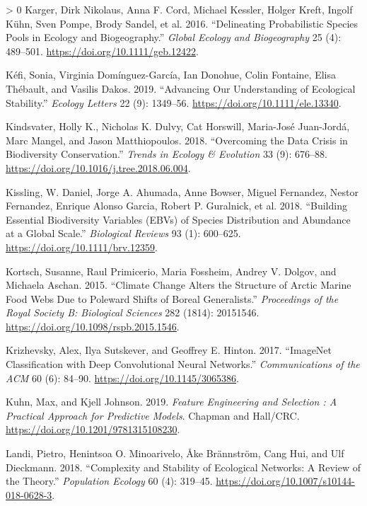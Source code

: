 \documentclass[11pt]{article}
\newlength{\cslhangindent}
\newenvironment{CSLReferences}[3] %
 {%
  \setlength{\parindent}{0pt}
  \ifodd #1 \everypar{\setlength{\hangindent}{\cslhangindent}}\ignorespaces\fi
  \ifnum #2 > 0
  \setlength{\parskip}{#2\baselineskip}
  \fi
 }%
 {}
\begin{document}
\begin{CSLReferences}{1}{0}
\leavevmode\hypertarget{ref-Karger2016DelPro}{}%
Karger, Dirk Nikolaus, Anna F. Cord, Michael Kessler, Holger Kreft,
Ingolf Kühn, Sven Pompe, Brody Sandel, et al. 2016. {``Delineating
Probabilistic Species Pools in Ecology and Biogeography.''} \emph{Global
Ecology and Biogeography} 25 (4): 489--501.
\url{https://doi.org/10.1111/geb.12422}.

\leavevmode\hypertarget{ref-Kefi2019AdvOur}{}%
Kéfi, Sonia, Virginia Domínguez-García, Ian Donohue, Colin Fontaine,
Elisa Thébault, and Vasilis Dakos. 2019. {``Advancing Our Understanding
of Ecological Stability.''} \emph{Ecology Letters} 22 (9): 1349--56.
\url{https://doi.org/10.1111/ele.13340}.

\leavevmode\hypertarget{ref-Kindsvater2018OveDat}{}%
Kindsvater, Holly K., Nicholas K. Dulvy, Cat Horswill, Maria-José
Juan-Jordá, Marc Mangel, and Jason Matthiopoulos. 2018. {``Overcoming
the Data Crisis in Biodiversity Conservation.''} \emph{Trends in Ecology
\& Evolution} 33 (9): 676--88.
\url{https://doi.org/10.1016/j.tree.2018.06.004}.

\leavevmode\hypertarget{ref-Kissling2018BuiEss}{}%
Kissling, W. Daniel, Jorge A. Ahumada, Anne Bowser, Miguel Fernandez,
Nestor Fernandez, Enrique Alonso Garcia, Robert P. Guralnick, et al.
2018. {``Building Essential Biodiversity Variables (EBVs) of Species
Distribution and Abundance at a Global Scale.''} \emph{Biological
Reviews} 93 (1): 600--625. \url{https://doi.org/10.1111/brv.12359}.

\leavevmode\hypertarget{ref-Kortsch2015CliCha}{}%
Kortsch, Susanne, Raul Primicerio, Maria Fossheim, Andrey V. Dolgov, and
Michaela Aschan. 2015. {``Climate Change Alters the Structure of Arctic
Marine Food Webs Due to Poleward Shifts of Boreal Generalists.''}
\emph{Proceedings of the Royal Society B: Biological Sciences} 282
(1814): 20151546. \url{https://doi.org/10.1098/rspb.2015.1546}.

\leavevmode\hypertarget{ref-Krizhevsky2017ImaCla}{}%
Krizhevsky, Alex, Ilya Sutskever, and Geoffrey E. Hinton. 2017.
{``ImageNet Classification with Deep Convolutional Neural Networks.''}
\emph{Communications of the ACM} 60 (6): 84--90.
\url{https://doi.org/10.1145/3065386}.

\leavevmode\hypertarget{ref-Kuhn2019FeaEng}{}%
Kuhn, Max, and Kjell Johnson. 2019. \emph{Feature Engineering and
Selection : A Practical Approach for Predictive Models}. Chapman and
Hall/CRC. \url{https://doi.org/10.1201/9781315108230}.

\leavevmode\hypertarget{ref-Landi2018ComSta}{}%
Landi, Pietro, Henintsoa O. Minoarivelo, Åke Brännström, Cang Hui, and
Ulf Dieckmann. 2018. {``Complexity and Stability of Ecological Networks:
A Review of the Theory.''} \emph{Population Ecology} 60 (4): 319--45.
\url{https://doi.org/10.1007/s10144-018-0628-3}.


\end{CSLReferences}
\end{document}
